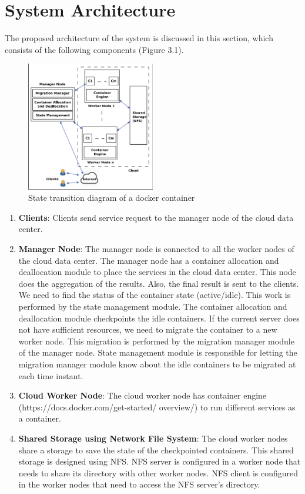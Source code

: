 \chapter{System Architecture}
The proposed architecture of the system is discussed in
this section, which consists of the following components
(Figure 3.1).
\begin{figure}[htbp]
\centerline{\includegraphics[width=0.5\textwidth]{fig1}}
\caption{ State transition diagram of a docker container}
\label{fig}
\end{figure}
\begin{enumerate}[i]
\item \textbf{Clients}: Clients send service request to the manager
node of the cloud data center.
\item \textbf{Manager Node}: The manager node is connected to all
the worker nodes of the cloud data center. The manager
node has a container allocation and deallocation module
to place the services in the cloud data center. This node
does the aggregation of the results. Also, the final result
is sent to the clients. We need to find the status of the
container state (active/idle). This work is performed by
the state management module. The container allocation
and deallocation module checkpoints the idle containers.
If the current server does not have sufficient resources,
we need to migrate the container to a new worker node.
This migration is performed by the migration manager
module of the manager node. State management module
is responsible for letting the migration manager module
know about the idle containers to be migrated at each
time instant.
\item \textbf{Cloud Worker Node}: The cloud worker node has
container engine (https://docs.docker.com/get-started/
overview/) to run different services as a container.
\item \textbf{Shared Storage using Network File System}: The cloud
worker nodes share a storage to save the state of the
checkpointed containers. This shared storage is designed
using NFS. NFS server is configured in a worker node
that needs to share its directory with other worker nodes.
NFS client is configured in the worker nodes that need
to access the NFS server’s directory.
\end{enumerate}
